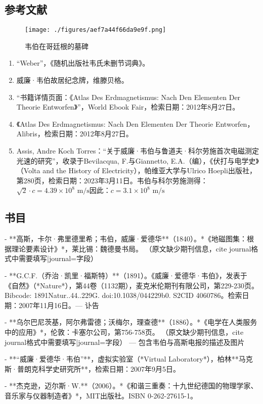 \subsection{参考文献}  
\begin{figure}[ht]
\centering
\texttt{[image: ./figures/aef7a44f66da9e9f.png]}
\caption{韦伯在哥廷根的墓碑} \label{fig_Eduard_5}
\end{figure}
\begin{enumerate}
\item “Weber”，《随机出版社韦氏未删节词典》。  
\item 威廉·韦伯故居纪念牌，维滕贝格。  
\item “书籍详情页面：《Atlas Des Erdmagnetismus: Nach Den Elementen Der Theorie Entworfen》”，World Ebook Fair，检索日期：2012年8月27日。  
\item 《Atlas Des Erdmagnetismus: Nach Den Elementen Der Theorie Entworfen，Alibris，检索日期：2012年8月27日。  
\item Assis, Andre Koch Torres：“关于威廉·韦伯与鲁道夫·科尔劳施首次电磁测定光速的研究”，收录于Bevilacqua, F.与Giannetto, E.A.（编），《伏打与电学史》（Volta and the History of Electricity），帕维亚大学与Ulrico Hoepli出版社，第280页，检索日期：2023年3月11日。韦伯与科尔劳施测得：\(\sqrt{2} \cdot c = 4.39 \times 10^8 \text{ m/s}\)因此：\(c = 3.1 \times 10^8 \text{ m/s}\)
\end{enumerate}
\subsection{书目}  

- **高斯，卡尔·弗里德里希；韦伯，威廉·爱德华**（1840）。*《地磁图集：根据理论要素设计》*，莱比锡：魏德曼书局。  
   （原文缺少期刊信息，{{cite journal}}格式中需要填写|journal=字段）  

- **G.C.F.（乔治·凯里·福斯特）**（1891）。《威廉·爱德华·韦伯》，发表于《自然》（*Nature*），第44卷（1132期），麦克米伦期刊有限公司，第229-230页。  
   Bibcode: 1891Natur..44..229G. doi:10.1038/044229b0. S2CID 4060786。检索日期：2007年11月16日。— 讣告  

- **乌尔巴尼茨基，阿尔弗雷德；沃梅尔，理查德**（1886）。*《电学在人类服务中的应用》*，伦敦：卡塞尔公司，第756-758页。  
   （原文缺少期刊信息，{{cite journal}}格式中需要填写|journal=字段）  
   — 包含韦伯与高斯电报的描述及图片  

- **“威廉·爱德华·韦伯”**，虚拟实验室（*Virtual Laboratory*），柏林**马克斯·普朗克科学史研究所**，检索日期：2007年9月5日。  

- **杰克逊，迈尔斯·W.**（2006）。*《和谐三重奏：十九世纪德国的物理学家、音乐家与仪器制造者》*，MIT出版社。ISBN 0-262-27615-1。